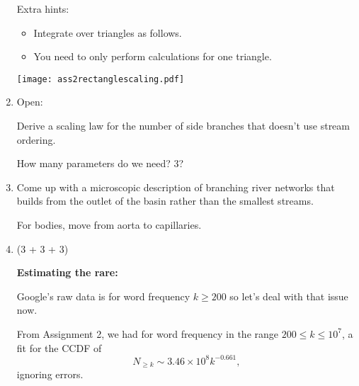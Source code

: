 \begin{enumerate}
  Extra hints: 
  \begin{itemize}
  \item 
    Integrate over triangles as follows.
  \item 
    You need to only perform calculations for one triangle.
  \end{itemize}

  \texttt{[image: ass2rectanglescaling.pdf]}

  
   \solutionstart


   \solutionend




    
\item
  Open:

  Derive a scaling law for the number of side branches
  that doesn't use stream ordering.

  How many parameters do we need?  3?

\item
  
  Come up with a microscopic description of branching river
  networks that builds from the outlet of the basin
  rather than the smallest streams.

  For bodies, move from aorta to capillaries.

\item (3 + 3 + 3)

  \textbf{Estimating the rare:}

  Google's raw data is for word frequency $k \ge 200$ so
  let's deal with that issue now.

  From Assignment 2,
  we had for word frequency in the range $200 \le k \le 10^{7}$,
  a fit for the CCDF of
  $$
  N_{\ge k} \sim 3.46 \times 10^{8} k^{-0.661},
  $$
  ignoring errors.


\end{enumerate}
